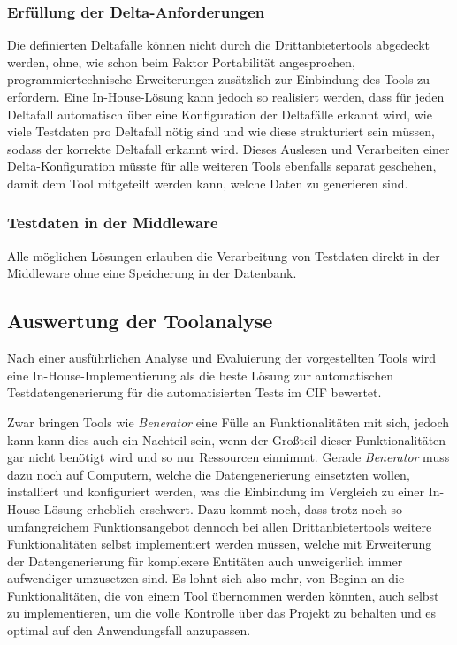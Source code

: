 \subsubsection*{Erfüllung der Delta-Anforderungen}
Die definierten Deltafälle können nicht durch die Drittanbietertools abgedeckt werden, ohne, wie schon beim Faktor Portabilität angesprochen, programmiertechnische Erweiterungen zusätzlich zur Einbindung des Tools zu erfordern. Eine In-House-Lösung kann jedoch so realisiert werden, dass für jeden Deltafall automatisch über eine Konfiguration der Deltafälle erkannt wird, wie viele Testdaten pro Deltafall nötig sind und wie diese strukturiert sein müssen, sodass der korrekte Deltafall erkannt wird. Dieses Auslesen und Verarbeiten einer Delta-Konfiguration müsste für alle weiteren Tools ebenfalls separat geschehen, damit dem Tool mitgeteilt werden kann, welche Daten zu generieren sind.

\subsubsection*{Testdaten in der Middleware}
Alle möglichen Lösungen erlauben die Verarbeitung von Testdaten direkt in der Middleware ohne eine Speicherung in der Datenbank.

\subsection{Auswertung der Toolanalyse}
Nach einer ausführlichen Analyse und Evaluierung der vorgestellten Tools wird eine In-House-Implementierung als die beste Lösung zur automatischen Testdatengenerierung für die automatisierten Tests im \ac{CIF} bewertet.

Zwar bringen Tools wie \textit{Benerator} eine Fülle an Funktionalitäten mit sich, jedoch kann kann dies auch ein Nachteil sein, wenn der Großteil dieser Funktionalitäten gar nicht benötigt wird und so nur Ressourcen einnimmt. Gerade \textit{Benerator} muss dazu noch auf Computern, welche die Datengenerierung einsetzten wollen, installiert und konfiguriert werden, was die Einbindung im Vergleich zu einer In-House-Lösung erheblich erschwert. Dazu kommt noch, dass trotz noch so umfangreichem Funktionsangebot dennoch bei allen Drittanbietertools weitere Funktionalitäten selbst implementiert werden müssen, welche mit Erweiterung der Datengenerierung für komplexere Entitäten auch unweigerlich immer aufwendiger umzusetzen sind. Es lohnt sich also mehr, von Beginn an die Funktionalitäten, die von einem Tool übernommen werden könnten, auch selbst zu implementieren, um die volle Kontrolle über das Projekt zu behalten und es optimal auf den Anwendungsfall anzupassen.


